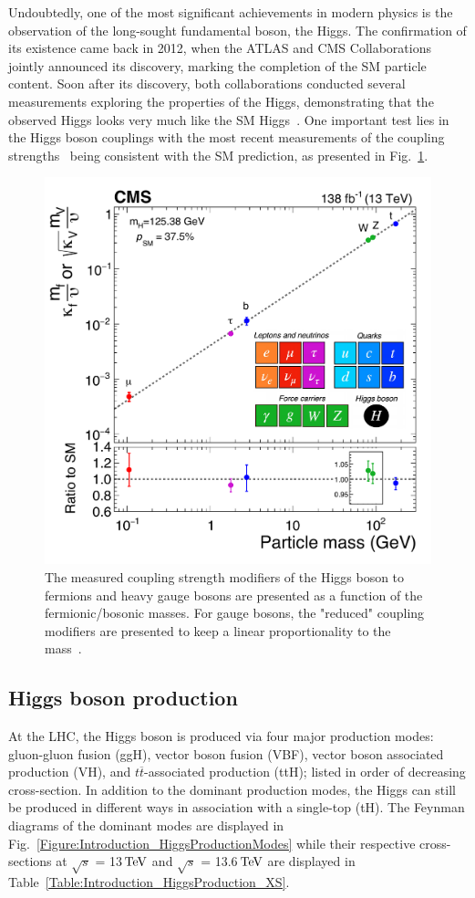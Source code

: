Undoubtedly, one of the most significant achievements in modern physics is the observation of the long-sought fundamental boson, the Higgs. The confirmation of its existence came back in 2012, when the ATLAS and CMS Collaborations~\cite{Higgs_ATLAS,Higgs_CMS} jointly announced its discovery, marking the completion of the SM particle content. Soon after its discovery, both collaborations conducted several measurements exploring the properties of the Higgs, demonstrating that the observed Higgs looks very much like the SM Higgs~\cite{HiggsParity_1,HiggsParity_2}. One important test lies in the Higgs boson couplings with the most recent measurements of the coupling strengths~\cite{CMS_Couplings_Measurement} being consistent with the SM prediction, as presented in Fig.~\ref{Figure:Introduction_CMScouplings}.

\begin{figure}[h]
\centering
\includegraphics[width= .7\textwidth]{Figures/Introduction/CMS_Higgs_FermionCouplings.pdf}
\caption{The measured coupling strength modifiers of the Higgs boson to fermions and heavy gauge bosons are presented as a function of the fermionic/bosonic masses. For gauge bosons, the "reduced" coupling modifiers are presented to keep a linear proportionality to the mass~\cite{CMS_Couplings_Measurement}.}
\label{Figure:Introduction_CMScouplings}
\end{figure}

\subsection{Higgs boson production}

At the \ac{LHC}, the Higgs boson is produced via four major production modes: gluon-gluon fusion (ggH), vector boson fusion (VBF), vector boson associated production (VH), and $t\overline{t}$-associated production (ttH); listed in order of decreasing cross-section. In addition to the dominant production modes, the Higgs can still be produced in different ways \eg in association with a single-top (tH). The Feynman diagrams of the dominant modes are displayed in Fig.~\ref{Figure:Introduction_HiggsProductionModes} while their respective cross-sections at $\sqrt{s}$ = 13$\,\text{Te\hspace{-.08em}V}$ and $\sqrt{s}$ = 13.6$\,\text{Te\hspace{-.08em}V}$ are displayed in Table~\ref{Table:Introduction_HiggsProduction_XS}. 


